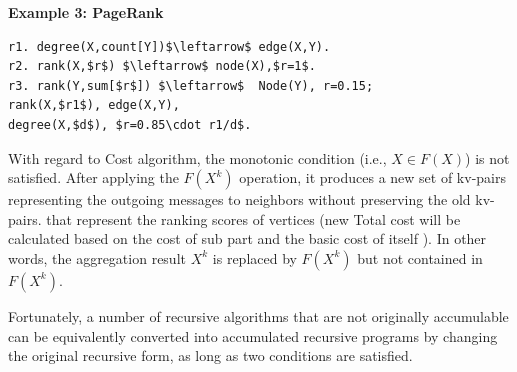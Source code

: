 \textbf{Example 3: PageRank}
\small
\begin{lstlisting}
r1. degree(X,count[Y])$\leftarrow$ edge(X,Y).
r2. rank(X,$r$) $\leftarrow$ node(X),$r=1$.
r3. rank(Y,sum[$r$]) $\leftarrow$  Node(Y), r=0.15;
rank(X,$r1$), edge(X,Y),
degree(X,$d$), $r=0.85\cdot r1/d$.
\end{lstlisting}
\normalsize


With regard to Cost algorithm, the monotonic condition (i.e., $X\in F(X)$) is not satisfied. After applying the $F(X^{k})$ operation, it produces a new set of kv-pairs representing the outgoing messages to neighbors  without preserving the old kv-pairs. {\color{green}that represent the ranking scores of vertices} (new Total cost  will be calculated based on the cost of sub part and the basic cost of itself ). In other words, the aggregation result $X^{k}$ is replaced by $F(X^{k})$ but not contained in $F(X^{k})$.

Fortunately, a number of recursive algorithms that are not originally accumulable can be equivalently converted into accumulated recursive programs by changing the original recursive form, as long as two conditions are satisfied.



